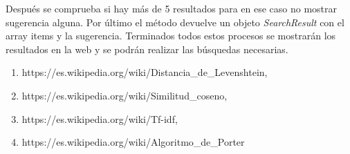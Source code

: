 \documentclass{article}
\begin{document}
Después se comprueba si hay más de 5 resultados para en ese caso no mostrar sugerencia alguna.
Por último el método devuelve un objeto \textit{SearchResult} con el array items y la sugerencia.
Terminados todos estos procesos se mostrarán los resultados en la web y se podrán realizar las búsquedas necesarias.



\begin{enumerate}
\item https://es.wikipedia.org/wiki/Distancia\_de\_Levenshtein,
\item https://es.wikipedia.org/wiki/Similitud\_coseno,
\item https://es.wikipedia.org/wiki/Tf-idf,
\item https://es.wikipedia.org/wiki/Algoritmo\_de\_Porter
\end{enumerate}
\end{document}

